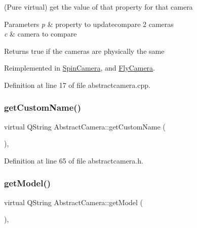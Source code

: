 (Pure virtual) get the value of that property for that camera 


\begin{DoxyParams}{Parameters}
{\em p} & property to updatecompare 2 cameras \\
\hline
{\em c} & camera to compare \\
\hline
\end{DoxyParams}
\begin{DoxyReturn}{Returns}
true if the cameras are physically the same 
\end{DoxyReturn}


Reimplemented in \mbox{\hyperlink{class_spin_camera_a1c3344dcd483c0ba889e8bb64d688039}{Spin\+Camera}}, and \mbox{\hyperlink{class_fly_camera_a8121735229105485f73289a36bd41042}{Fly\+Camera}}.



Definition at line 17 of file abstractcamera.\+cpp.

\mbox{\label{class_abstract_camera_acdbe8cb6af440aefa5958c6919ff1ec1}} 
\subsubsection{\texorpdfstring{getCustomName()}{getCustomName()}}
{\footnotesize\ttfamily virtual Q\+String Abstract\+Camera\+::get\+Custom\+Name (\begin{DoxyParamCaption}{ }\end{DoxyParamCaption})\hspace{0.3cm}{\ttfamily [inline]}, {\ttfamily [virtual]}}



Definition at line 65 of file abstractcamera.\+h.

\mbox{\label{class_abstract_camera_ae263e210c55f094ef5b8fc8cb3341043}} 
\subsubsection{\texorpdfstring{getModel()}{getModel()}}
{\footnotesize\ttfamily virtual Q\+String Abstract\+Camera\+::get\+Model (\begin{DoxyParamCaption}{ }\end{DoxyParamCaption})\hspace{0.3cm}{\ttfamily [inline]}, {\ttfamily [virtual]}}




